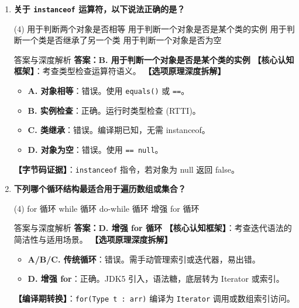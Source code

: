 \documentclass[12pt, a4paper]{ctexart}
\newcommand{\code}[1]{\texttt{#1}}
\begin{document}
\begin{enumerate}[label=\textbf{\arabic*.}, itemsep=1em]
    \item \textbf{关于 \code{instanceof} 运算符，以下说法正确的是？}
    \begin{tasks}(4)
        \task 用于判断两个对象是否相等 \task 用于判断一个对象是否是某个类的实例
        \task 用于判断一个类是否继承了另一个类 \task 用于判断一个对象是否为空
    \end{tasks}
    \begin{bluebox}{答案与深度解析}
    \textbf{答案：B. 用于判断一个对象是否是某个类的实例}
    \textbf{【核心认知框架】}：考查类型检查运算符语义。
    \textbf{【选项原理深度拆解】}
    \begin{itemize}[leftmargin=*, nosep]
        \item \textbf{A. 对象相等}：错误。使用 \code{equals()} 或 \code{==}。
        \item \textbf{B. 实例检查}：正确。运行时类型检查 (RTTI)。
        \item \textbf{C. 类继承}：错误。编译期已知，无需 instanceof。
        \item \textbf{D. 对象为空}：错误。使用 \code{== null}。
    \end{itemize}
    \textbf{【字节码证据】}：\code{instanceof} 指令，若对象为 null 返回 false。
    \end{bluebox}

    \item \textbf{下列哪个循环结构最适合用于遍历数组或集合？}
    \begin{tasks}(4)
        \task for 循环 \task while 循环 \task do-while 循环 \task 增强 for 循环
    \end{tasks}
    \begin{bluebox}{答案与深度解析}
    \textbf{答案：D. 增强 for 循环}
    \textbf{【核心认知框架】}：考查迭代语法的简洁性与适用场景。
    \textbf{【选项原理深度拆解】}
    \begin{itemize}[leftmargin=*, nosep]
        \item \textbf{A/B/C. 传统循环}：错误。需手动管理索引或迭代器，易出错。
        \item \textbf{D. 增强 for}：正确。JDK5 引入，语法糖，底层转为 Iterator 或索引。
    \end{itemize}
    \textbf{【编译期转换】}：\code{for(Type t : arr)} 编译为 \code{Iterator} 调用或数组索引访问。
    \end{bluebox}


\end{enumerate}
\end{document}
